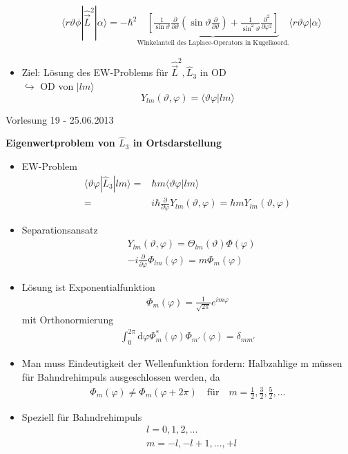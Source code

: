 \documentclass[10pt,article,colorback,accentcolor=tud9d]{scrartcl}
\begin{document}
\begin{itemize}
\begin{align}
    &\langle r\vartheta\phi|\hat{\vec{L}}^2|\alpha\rangle=-\hbar^2\underbrace{\left[\frac{1}{\sin\vartheta}\frac{\partial}{\partial\vartheta}\left(\sin\vartheta\frac{\partial}{\partial\vartheta}\right)+\frac{1}{\sin^2\vartheta}\frac{\partial^2}{\partial\varphi^2}\right]}_{\text{Winkelanteil des Laplace-Operators in Kugelkoord.}}\langle r\vartheta\varphi|\alpha\rangle
    \end{align}
  \item Ziel: Lösung des EW-Problems für $\hat{\vec{L}}^2,\hat{L}_3$ in OD\\
  $\hookrightarrow$ OD von $|lm\rangle$
  \begin{equation}
  Y_{lm}(\vartheta,\varphi)=\langle\vartheta\varphi|lm\rangle
  \end{equation}
\end{itemize}


\begin{flushright}
Vorlesung 19 - 25.06.2013
\end{flushright}
\textbf{Eigenwertproblem von $\hat{L}_3$ in Ortsdarstellung}
\begin{itemize}
	\item EW-Problem
    \begin{align}
    \langle\vartheta\varphi|\hat{L}_3|lm\rangle=&\hbar m \langle\vartheta\varphi|lm\rangle\\
    =&i\hbar\frac{\partial}{\partial\varphi}Y_{lm}(\vartheta,\varphi)=\hbar m Y_{lm}(\vartheta,\varphi)
    \end{align}
  \item Separationsansatz
    \begin{align}
    &Y_{lm}(\vartheta,\varphi)=\Theta_{lm}(\vartheta)\Phi(\varphi)\\
    &-i\frac{\partial}{\partial\varphi}\Phi_{lm}(\varphi)=m\Phi_m(\varphi)
    \end{align}
  \item Lösung ist Exponentialfunktion
    \begin{align}
    \Phi_m(\varphi)=\frac{1}{\sqrt{2\pi}}e^{im\varphi}
    \end{align}
    mit Orthonormierung
    \begin{align}
    \int_0^{2\pi}\text{d}\varphi\Phi^*_m(\varphi)\Phi_{m'}(\varphi)=\delta_{mm'}
    \end{align}
  \item Man muss Eindeutigkeit der Wellenfunktion fordern: Halbzahlige m müssen für Bahndrehimpuls ausgeschlossen werden, da
    \begin{align}
    \Phi_m(\varphi)\neq\Phi_m(\varphi+2\pi)\quad\text{für}\quad m=\frac{1}{2},\frac{3}{2},\frac{5}{2},...
    \end{align}
  \item Speziell für Bahndrehimpuls
    \begin{align}
    &l=0,1,2,...\\
    &m=-l,-l+1,...,+l
    \end{align}
\end{itemize}
\end{document}
